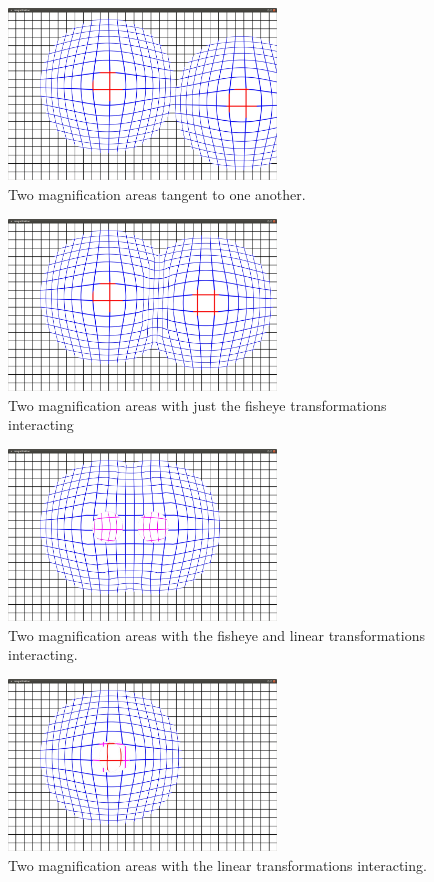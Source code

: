 \documentclass[annual]{acmsiggraph}
\begin{document}
\begin{figure}
	\centering
	\includegraphics[width=2.8in]{figures/tangent.jpg}
	\caption{Two magnification areas tangent to one another.}
	\label{fig:tangent}
\end{figure}
\begin{figure}
	\centering
	\includegraphics[width=2.8in]{figures/outer.jpg}
	\caption{Two magnification areas with just the fisheye
    transformations interacting}
	\label{fig:outer}
\end{figure}
\begin{figure}
	\centering
	\includegraphics[width=2.8in]{figures/inner_and_outer.jpg}
	\caption{Two magnification areas with the fisheye and
    linear transformations interacting.}
	\label{fig:inner_and_outer}
\end{figure}
\begin{figure}
	\centering
	\includegraphics[width=2.8in]{figures/inner_and_inner.jpg}
	\caption{Two magnification areas with the linear transformations
    interacting.}
	\label{fig:inner_and_inner}
\end{figure}
\end{document}
